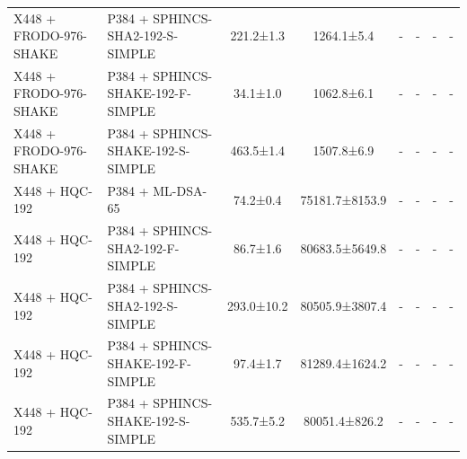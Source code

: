 \documentclass[10pt]{article}
\begin{document}
\begin{tabular}{@{}l l c c c c c c@{}}
X448 + FRODO-976-SHAKE & P384 + SPHINCS-SHA2-192-S-SIMPLE & 221.2±1.3 & 1264.1±5.4 & - & - & - & - \\
X448 + FRODO-976-SHAKE & P384 + SPHINCS-SHAKE-192-F-SIMPLE & 34.1±1.0 & 1062.8±6.1 & - & - & - & - \\
X448 + FRODO-976-SHAKE & P384 + SPHINCS-SHAKE-192-S-SIMPLE & 463.5±1.4 & 1507.8±6.9 & - & - & - & - \\
X448 + HQC-192 & P384 + ML-DSA-65 & 74.2±0.4 & 75181.7±8153.9 & - & - & - & - \\
X448 + HQC-192 & P384 + SPHINCS-SHA2-192-F-SIMPLE & 86.7±1.6 & 80683.5±5649.8 & - & - & - & - \\
X448 + HQC-192 & P384 + SPHINCS-SHA2-192-S-SIMPLE & 293.0±10.2 & 80505.9±3807.4 & - & - & - & - \\
X448 + HQC-192 & P384 + SPHINCS-SHAKE-192-F-SIMPLE & 97.4±1.7 & 81289.4±1624.2 & - & - & - & - \\
X448 + HQC-192 & P384 + SPHINCS-SHAKE-192-S-SIMPLE & 535.7±5.2 & 80051.4±826.2 & - & - & - & - \\
\bottomrule
\end{tabular}
\end{document}
